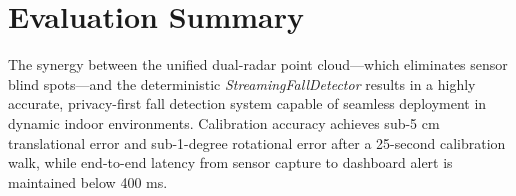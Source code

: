 \section{Evaluation Summary}
The synergy between the unified dual-radar point cloud---which eliminates sensor blind spots---and the deterministic \textit{StreamingFallDetector} results in a highly accurate, privacy-first fall detection system capable of seamless deployment in dynamic indoor environments. Calibration accuracy achieves sub-5 cm translational error and sub-1-degree rotational error after a 25-second calibration walk, while end-to-end latency from sensor capture to dashboard alert is maintained below 400 ms.

